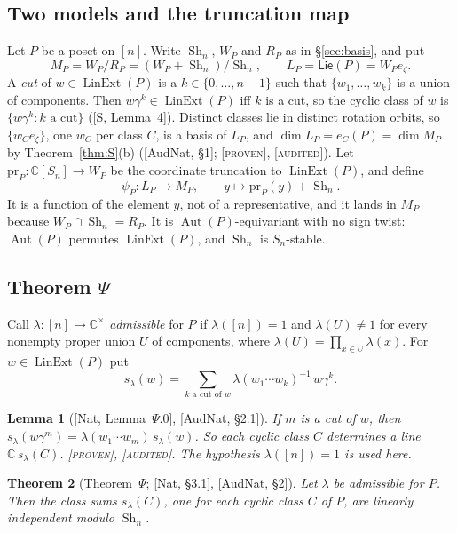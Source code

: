 \documentclass[11pt]{article}
\newtheorem{theorem}{Theorem}[section]
\newtheorem{lemma}[theorem]{Lemma}
\theoremstyle{definition}
\theoremstyle{remark}
\newcommand{\Lin}{\operatorname{LinExt}}
\newcommand{\Aut}{\operatorname{Aut}}
\newcommand{\PLie}{\mathsf{Lie}}
\newcommand{\Sh}{\operatorname{Sh}}
\newcommand{\st}[1]{\textup{[\textsc{#1}]}}
\begin{document}
\subsection{Two models and the truncation map}

Let $P$ be a poset on $[n]$. Write $\Sh_n$, $W_P$ and $R_P$ as in
\S\ref{sec:basis}, and put
\[
M_P=W_P/R_P=(W_P+\Sh_n)/\Sh_n,\qquad L_P=\PLie(P)=W_Pe_\zeta .
\]
A \emph{cut} of $w\in\Lin(P)$ is a $k\in\{0,\dots,n-1\}$ such that
$\{w_1,\dots,w_k\}$ is a union of components. Then $w\gamma^k\in\Lin(P)$ iff
$k$ is a cut, so the cyclic class of $w$ is $\{w\gamma^k:k\text{ a cut}\}$
([S, Lemma~4]). Distinct classes lie in distinct rotation orbits, so
$\{w_Ce_\zeta\}$, one $w_C$ per class $C$, is a basis of $L_P$, and
$\dim L_P=e_C(P)=\dim M_P$ by Theorem~\ref{thm:S}(b) ([AudNat, \S1];
\st{proven}, \st{audited}). Let $\mathrm{pr}_P:\mathbb C[S_n]\to W_P$ be the
coordinate truncation to $\Lin(P)$, and define
\[
\psi_P:L_P\to M_P,\qquad y\mapsto\mathrm{pr}_P(y)+\Sh_n .
\]
It is a function of the element $y$, not of a representative, and it lands
in $M_P$ because $W_P\cap\Sh_n=R_P$. It is $\Aut(P)$-equivariant with no sign
twist: $\Aut(P)$ permutes $\Lin(P)$, and $\Sh_n$ is $S_n$-stable.

\subsection{Theorem $\Psi$}

Call $\lambda:[n]\to\mathbb C^\times$ \emph{admissible} for $P$ if
$\lambda([n])=1$ and $\lambda(U)\ne1$ for every nonempty proper union $U$ of
components, where $\lambda(U)=\prod_{x\in U}\lambda(x)$. For $w\in\Lin(P)$ put
\[
s_\lambda(w)=\sum_{k\text{ a cut of }w}\lambda(w_1\cdots w_k)^{-1}\,w\gamma^k .
\]

\begin{lemma}[{[Nat, Lemma~$\Psi$.0]}, {[AudNat, \S2.1]}]\label{lem:psi0}
If $m$ is a cut of $w$, then
$s_\lambda(w\gamma^m)=\lambda(w_1\cdots w_m)\,s_\lambda(w)$. So each cyclic
class $C$ determines a line $\mathbb C\,s_\lambda(C)$. \st{proven},
\st{audited}. The hypothesis $\lambda([n])=1$ is used here.
\end{lemma}

\begin{theorem}[Theorem~$\Psi$; {[Nat, \S3.1]}, {[AudNat, \S2]}]\label{thm:Psi}
Let $\lambda$ be admissible for $P$. Then the class sums $s_\lambda(C)$, one
for each cyclic class $C$ of $P$, are linearly independent modulo $\Sh_n$.
\end{theorem}
\end{document}
